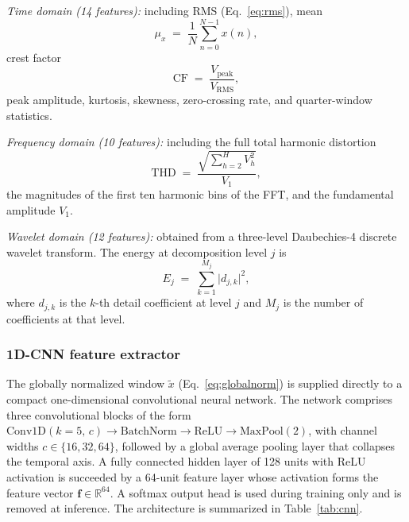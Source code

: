 \documentclass[conference]{IEEEtran}
\begin{document}
\textit{Time domain (14 features):} including RMS (Eq.~\ref{eq:rms}),
mean
\begin{equation}
  \mu_x \;=\; \frac{1}{N}\sum_{n=0}^{N-1} x(n),
\end{equation}
crest factor
\begin{equation}
  \mathrm{CF} \;=\; \frac{V_{\mathrm{peak}}}{V_{\mathrm{RMS}}},
\end{equation}
peak amplitude, kurtosis, skewness, zero-crossing rate, and
quarter-window statistics.

\textit{Frequency domain (10 features):} including the full total
harmonic distortion
\begin{equation}
  \mathrm{THD} \;=\; \frac{\sqrt{\sum_{h=2}^{H} V_h^{2}}}{V_1},
  \label{eq:thd_full}
\end{equation}
the magnitudes of the first ten harmonic bins of the FFT, and the
fundamental amplitude $V_1$.

\textit{Wavelet domain (12 features):} obtained from a three-level
Daubechies-4 discrete wavelet transform. The energy at decomposition
level $j$ is
\begin{equation}
  E_j \;=\; \sum_{k=1}^{M_j} \bigl|d_{j,k}\bigr|^{2},
  \label{eq:wavelet}
\end{equation}
where $d_{j,k}$ is the $k$-th detail coefficient at level $j$ and
$M_j$ is the number of coefficients at that level.

\subsubsection{1D-CNN feature extractor}
The globally normalized window $\tilde{x}$ (Eq.~\ref{eq:globalnorm})
is supplied directly to a compact one-dimensional convolutional
neural network. The network comprises three convolutional blocks of
the form $\textrm{Conv1D}(k\!=\!5,\,c) \!\to\! \textrm{BatchNorm}
\!\to\! \textrm{ReLU} \!\to\! \textrm{MaxPool}(2)$, with channel
widths $c \in \{16, 32, 64\}$, followed by a global average pooling
layer that collapses the temporal axis. A fully connected hidden
layer of 128 units with ReLU activation is succeeded by a 64-unit
feature layer whose activation forms the feature vector
$\mathbf{f} \in \mathbb{R}^{64}$. A softmax output head is used
during training only and is removed at inference. The architecture
is summarized in Table~\ref{tab:cnn}.
\end{document}
